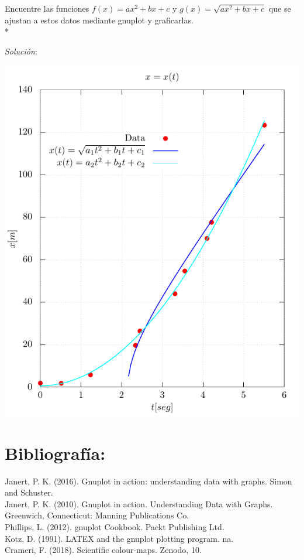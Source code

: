 \documentclass[11.5pt,a4paper]{article}
\begin{document}
Encuentre las funciones $f(x)=ax^2+bx+c$ y $g(x)=\sqrt{ax^2+bx+c}$ que se ajustan a estos datos mediante gnuplot y graficarlas.\\*

\textit{Solución}:

\includegraphics[scale=0.75]{ejercicio3.pdf}\\





\section{Bibliografía:}

Janert, P. K. (2016). Gnuplot in action: understanding data with graphs. Simon and Schuster.\\

Janert, P. K. (2010). Gnuplot in action. Understanding Data with Graphs. Greenwich, Connecticut: Manning Publications Co.\\

Phillips, L. (2012). gnuplot Cookbook. Packt Publishing Ltd.\\

Kotz, D. (1991). LATEX and the gnuplot plotting program. na.\\

Crameri, F. (2018). Scientific colour-maps. Zenodo, 10.
\end{document}
